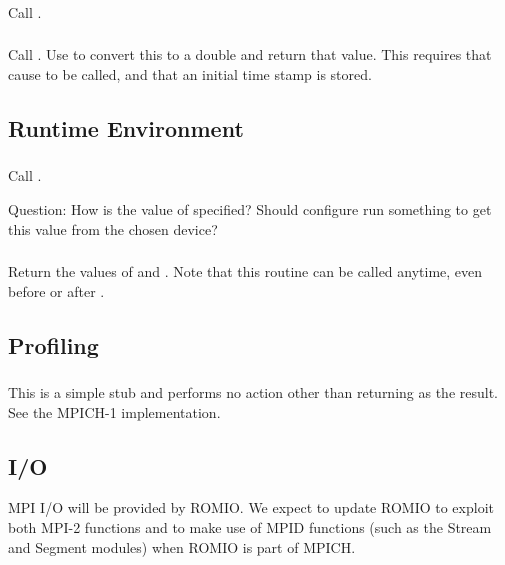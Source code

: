 \documentclass{article}
\begin{document}
\subsubsection{}
Call .

\subsubsection{}
Call .  Use  to convert this to
a double and return that value.
This requires that  cause  to be
called, and that an initial time stamp is stored.

\subsection{Runtime Environment}
\subsubsection{}
Call .  

Question: How is the value of  specified?
Should configure run something to get this value from the chosen device?

\subsubsection{}
Return the values of  and . 
Note that this routine can be called anytime, even before  or
after .

\subsection{Profiling}

\subsubsection{}
This is a simple stub and performs no action other than returning
 as the result.  See the MPICH-1 implementation.

\subsection{I/O}
MPI I/O will be provided by ROMIO.  We expect to update ROMIO to exploit both
MPI-2 functions and to make use of MPID functions (such as the Stream and
Segment modules) when ROMIO is part of MPICH.
\end{document}
